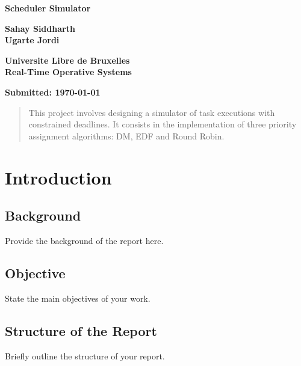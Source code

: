 \documentclass[12pt,a4paper]{report}
\begin{document}
	
	\begin{titlepage}
		\centering
		\vspace*{2cm}
		
		\Huge
		\textbf{Scheduler Simulator}
		
		\vspace{1.5cm}
		
		\Large
		\textbf{Sahay Siddharth} \\
		\textbf{Ugarte Jordi}		
		
		\vfill
		
		\Large
		\textbf{Universite Libre de Bruxelles} \\
		\textbf{Real-Time Operative Systems}
		
		\vspace{0.8cm}
		
		\large
		\textbf{Submitted: \today}
		
		\vfill
	\end{titlepage}
	
	\begin{abstract}
		This project involves designing a simulator of task executions with constrained deadlines. It consists in the implementation of three priority assignment algorithms: DM, EDF and Round Robin.
	\end{abstract}

	
	\tableofcontents
	\newpage
	
	\listoffigures
	\newpage
	
	\listoftables
	\newpage
	
	\chapter{Introduction}
	\section{Background}
	Provide the background of the report here.
	\section{Objective}
	State the main objectives of your work.
	\section{Structure of the Report}
	Briefly outline the structure of your report.
	
\end{document}
